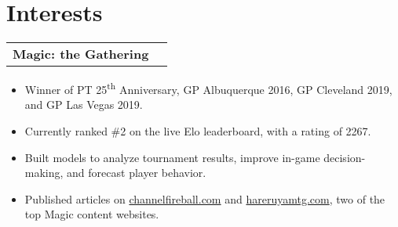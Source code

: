 \documentclass[letterpaper,11pt]{article}
\makeatletter
\newcommand{\resumeItemB}[2]{
	\item[]\small{
		\textbf{#1}{: #2 \vspace{-2pt}}
	}
}
\newcommand{\resumePoint}[1]{
	\item[$\bullet$]\small{
		{#1 \vspace{-2pt}}
	}
}
\newcommand{\resumeSubheadingShort}[2]{
	\small{\vspace{-1pt}\item[]
	\begin{tabular*}{0.97\textwidth}{l@{\extracolsep{\fill}}r}
		\textbf{#1} & #2 \\
	\end{tabular*}\vspace{-5pt}}
}
\newcommand{\resumeSubItemB}[2]{\resumeItemB{#1}{#2}\vspace{-4pt}}
\newcommand{\resumeListStart}{\begin{itemize}[leftmargin=*]}
\newcommand{\resumeListEnd}{\end{itemize}}
\newcommand{\resumeItemListStart}{\begin{itemize}}
\newcommand{\resumeItemListEnd}{\end{itemize}\vspace{-4pt}}
\makeatother
\begin{document}


\section{Interests}
\resumeListStart

	\resumeSubheadingShort
		{Magic: the Gathering}{}
		\resumeItemListStart
			\resumePoint{Winner of PT 25\textsuperscript{th} Anniversary, GP Albuquerque 2016, GP Cleveland 2019, and GP Las Vegas 2019.}
			\resumePoint{Currently ranked \#2 on the live Elo leaderboard, with a rating of 2267.}
			\resumePoint{Built models to analyze tournament results, improve in-game decision-making, and forecast player behavior.}
			\resumePoint{Published articles on \href{https://www.channelfireball.com/author/allen-wu/}{channelfireball.com} and \href{https://article.hareruyamtg.com/article/author/allenwu_en/?lang=en}{hareruyamtg.com}, two of the top Magic content websites.}
		\resumeItemListEnd
		
		

\resumeListEnd




\end{document}
